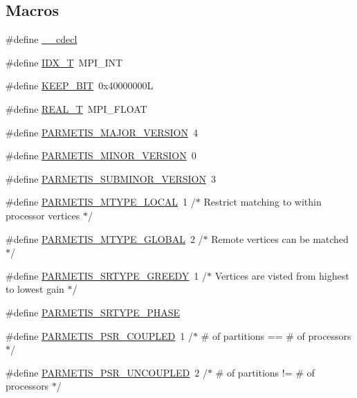 \subsection*{Macros}
\begin{DoxyCompactItemize}
\item 
\#define \hyperlink{a00843_a238347d7669f8f1e9c83bfe63a2730c4}{\+\_\+\+\_\+cdecl}
\item 
\#define \hyperlink{a00843_abe38a42aa75cd5998368d69cbad731a9}{I\+D\+X\+\_\+T}~M\+P\+I\+\_\+\+I\+NT
\item 
\#define \hyperlink{a00843_a428068e8f33ae169d4d9516102bd863c}{K\+E\+E\+P\+\_\+\+B\+IT}~0x40000000L
\item 
\#define \hyperlink{a00843_aad262b5311ae7d2166c3fcaa58d1834b}{R\+E\+A\+L\+\_\+T}~M\+P\+I\+\_\+\+F\+L\+O\+AT
\item 
\#define \hyperlink{a00843_aa48ba987f3ff8d56871c3fb2bed6d314}{P\+A\+R\+M\+E\+T\+I\+S\+\_\+\+M\+A\+J\+O\+R\+\_\+\+V\+E\+R\+S\+I\+ON}~4
\item 
\#define \hyperlink{a00843_ad51bc57fc5083572dd337e204de625ff}{P\+A\+R\+M\+E\+T\+I\+S\+\_\+\+M\+I\+N\+O\+R\+\_\+\+V\+E\+R\+S\+I\+ON}~0
\item 
\#define \hyperlink{a00843_a1d99bc97bff12181a8ad9588069a1f41}{P\+A\+R\+M\+E\+T\+I\+S\+\_\+\+S\+U\+B\+M\+I\+N\+O\+R\+\_\+\+V\+E\+R\+S\+I\+ON}~3
\item 
\#define \hyperlink{a00843_a8688bf16d43a979a690cef51e4e57d48}{P\+A\+R\+M\+E\+T\+I\+S\+\_\+\+M\+T\+Y\+P\+E\+\_\+\+L\+O\+C\+AL}~1    /$\ast$ Restrict matching to within processor vertices $\ast$/
\item 
\#define \hyperlink{a00843_af25d77131e25b013f79a5a7644c5792f}{P\+A\+R\+M\+E\+T\+I\+S\+\_\+\+M\+T\+Y\+P\+E\+\_\+\+G\+L\+O\+B\+AL}~2    /$\ast$ Remote vertices can be matched $\ast$/
\item 
\#define \hyperlink{a00843_ac0d490032ded504c8022884265a11546}{P\+A\+R\+M\+E\+T\+I\+S\+\_\+\+S\+R\+T\+Y\+P\+E\+\_\+\+G\+R\+E\+E\+DY}~1    /$\ast$ Vertices are visted from highest to lowest gain $\ast$/
\item 
\#define \hyperlink{a00843_a614e5181ee41475b1ffde007468e0526}{P\+A\+R\+M\+E\+T\+I\+S\+\_\+\+S\+R\+T\+Y\+P\+E\+\_\+P\+H\+A\+SE}
\item 
\#define \hyperlink{a00843_a4703e7e2556a1a53794358fc85b8c103}{P\+A\+R\+M\+E\+T\+I\+S\+\_\+\+P\+S\+R\+\_\+\+C\+O\+U\+P\+L\+ED}~1    /$\ast$ \# of partitions == \# of processors $\ast$/
\item 
\#define \hyperlink{a00843_a0462a45a6c6bafa94c1327994fd3d9bd}{P\+A\+R\+M\+E\+T\+I\+S\+\_\+\+P\+S\+R\+\_\+\+U\+N\+C\+O\+U\+P\+L\+ED}~2    /$\ast$ \# of partitions != \# of processors $\ast$/

\end{DoxyCompactItemize}
